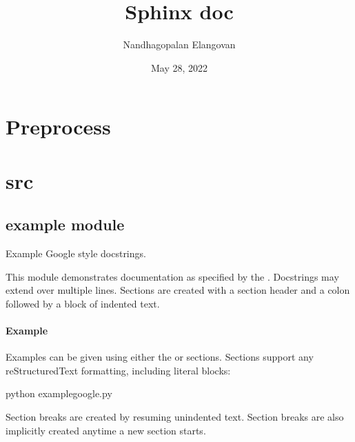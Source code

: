\documentclass[letterpaper,10pt,english]{sphinxmanual}
\title{Sphinx doc}
\date{May 28, 2022}
\author{Nandhagopalan Elangovan}
\begin{document}
\pagestyle{empty}
\sphinxmaketitle
\pagestyle{plain}
\sphinxtableofcontents
\pagestyle{normal}
\label{\detokenize{index::doc}}


\sphinxstepscope


\chapter{Preprocess}
\label{\detokenize{notes/modules:preprocess}}\label{\detokenize{notes/modules::doc}}
\sphinxstepscope


\chapter{src}
\label{\detokenize{source/modules:src}}\label{\detokenize{source/modules::doc}}
\sphinxstepscope


\section{example module}
\label{\detokenize{source/example:module-example}}\label{\detokenize{source/example:example-module}}\label{\detokenize{source/example::doc}}
\sphinxAtStartPar
Example Google style docstrings.

\sphinxAtStartPar
This module demonstrates documentation as specified by the . Docstrings may extend over multiple lines. Sections are created
with a section header and a colon followed by a block of indented text.
\subsubsection*{Example}

\sphinxAtStartPar
Examples can be given using either the  or 
sections. Sections support any reStructuredText formatting, including
literal blocks:

\begin{sphinxVerbatim}[commandchars=\\\{\}]
\PYGZdl{} python example\PYGZus{}google.py
\end{sphinxVerbatim}

\sphinxAtStartPar
Section breaks are created by resuming unindented text. Section breaks
are also implicitly created anytime a new section starts.
\end{document}
